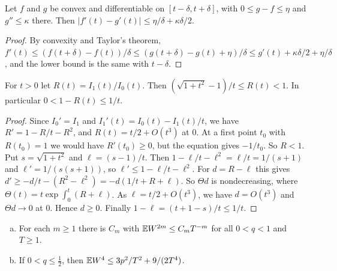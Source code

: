 \begin{lemma}[convexity]\label{lem:fisher-convex}
Let $f$ and $g$ be convex and differentiable on $[t-\delta,t+\delta]$, with
$0\le g-f\le\eta$ and $g''\le\kappa$ there. Then
$|f'(t)-g'(t)|\le\eta/\delta+\kappa\delta/2$.
\end{lemma}

\begin{proof}
By convexity and Taylor's theorem,
$f'(t)\le(f(t+\delta)-f(t))/\delta\le(g(t+\delta)-g(t)+\eta)/\delta
\le g'(t)+\kappa\delta/2+\eta/\delta$, and the lower bound is the same with
$t-\delta$.
\end{proof}

\begin{lemma}\label{lem:fisher-bessel}
For $t>0$ let $R(t)=I_1(t)/I_0(t)$. Then
$(\sqrt{1+t^2}-1)/t\le R(t)<1$. In particular $0<1-R(t)\le1/t$.
\end{lemma}

\begin{proof}
Since $I_0'=I_1$ and $I_1'(t)=I_0(t)-I_1(t)/t$, we have $R'=1-R/t-R^2$, and
$R(t)=t/2+O(t^3)$ at $0$. At a first point $t_0$ with $R(t_0)=1$ we would
have $R'(t_0)\ge0$, but the equation gives $-1/t_0$. So $R<1$. Put
$s=\sqrt{1+t^2}$ and $\ell=(s-1)/t$. Then $1-\ell/t-\ell^2=\ell/t=1/(s+1)$ and
$\ell'=1/(s(s+1))$, so $\ell'\le1-\ell/t-\ell^2$. For $d=R-\ell$ this gives
$d'\ge-d/t-(R^2-\ell^2)=-d(1/t+R+\ell)$. So $\Theta d$ is nondecreasing, where
$\Theta(t)=t\exp\int_0^t(R+\ell)$. As $\ell=t/2+O(t^3)$, we have
$d=O(t^3)$ and $\Theta d\to0$ at $0$. Hence $d\ge0$. Finally
$1-\ell=(t+1-s)/t\le1/t$.
\end{proof}

\begin{lemma}\label{lem:fisher-W}
\begin{enumerate}[(a)]
\item For each $m\ge1$ there is $C_m$ with $\mathbb E W^{2m}\le C_mT^{-m}$ for all
$0<q<1$ and $T\ge1$.
\item If $0<q\le\frac12$, then $\mathbb E W^4\le3p^2/T^2+9/(2T^4)$.
\end{enumerate}
\end{lemma}

